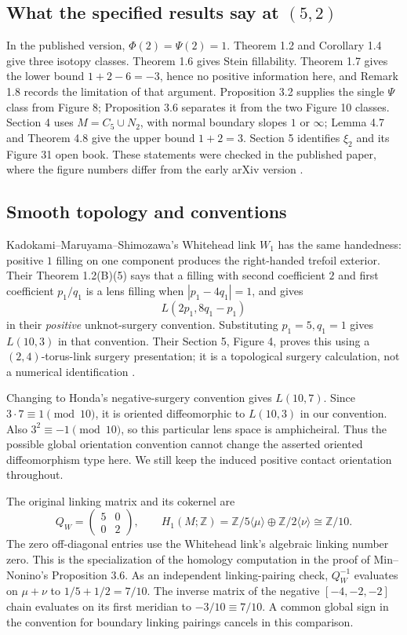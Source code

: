\documentclass[12pt]{amsart}
\theoremstyle{definition}
\theoremstyle{remark}
\numberwithin{equation}{section}
\newcommand{\Z}{\mathbb{Z}}
\theoremstyle{definition}
\begin{document}
\subsection{What the specified results say at $(5,2)$}
In the published version, $\Phi(2)=\Psi(2)=1$. Theorem 1.2 and Corollary 1.4 give three isotopy classes. Theorem 1.6 gives Stein fillability. Theorem 1.7 gives the lower bound $1+2-6=-3$, hence no positive information here, and Remark 1.8 records the limitation of that argument. Proposition 3.2 supplies the single $\Psi$ class from Figure 8; Proposition 3.6 separates it from the two Figure 10 classes. Section 4 uses $M=C_5\cup N_2$, with normal boundary slopes $1$ or $\infty$; Lemma 4.7 and Theorem 4.8 give the upper bound $1+2=3$. Section 5 identifies $\xi_2$ and its Figure 31 open book. These statements were checked in the published paper, where the figure numbers differ from the early arXiv version \cite{en-MN}.

\subsection{Smooth topology and conventions}
Kadokami--\allowbreak Maruyama--\allowbreak Shimozawa's Whitehead link $W_1$ has the same handedness: positive $1$ filling on one component produces the right-handed trefoil exterior. Their Theorem 1.2(B)(5) says that a filling with second coefficient $2$ and first coefficient $p_1/q_1$ is a lens filling when $|p_1-4q_1|=1$, and gives
\[
L(2p_1,8q_1-p_1)
\]
in their \emph{positive} unknot-surgery convention. Substituting $p_1=5,q_1=1$ gives $L(10,3)$ in that convention. Their Section 5, Figure 4, proves this using a $(2,4)$-torus-link surgery presentation; it is a topological surgery calculation, not a numerical identification \cite{en-KMS}.

Changing to Honda's negative-surgery convention gives $L(10,7)$. Since $3\cdot7\equiv1\pmod {10}$, it is oriented diffeomorphic to $L(10,3)$ in our convention. Also $3^2\equiv-1\pmod {10}$, so this particular lens space is amphicheiral. Thus the possible global orientation convention cannot change the asserted oriented diffeomorphism type here. We still keep the induced positive contact orientation throughout.

The original linking matrix and its cokernel are
\begin{equation}\label{en-homology}
Q_W=\begin{pmatrix}5&0\\0&2\end{pmatrix},\qquad
H_1(M;\Z)=\Z/5\langle\mu\rangle\oplus\Z/2\langle\nu\rangle\cong\Z/10.
\end{equation}
The zero off-diagonal entries use the Whitehead link's algebraic linking number zero. This is the specialization of the homology computation in the proof of Min--Nonino's Proposition 3.6. As an independent linking-pairing check, $Q_W^{-1}$ evaluates on $\mu+\nu$ to $1/5+1/2=7/10$. The inverse matrix of the negative $[-4,-2,-2]$ chain evaluates on its first meridian to $-3/10\equiv7/10$. A common global sign in the convention for boundary linking pairings cancels in this comparison.
\end{document}
